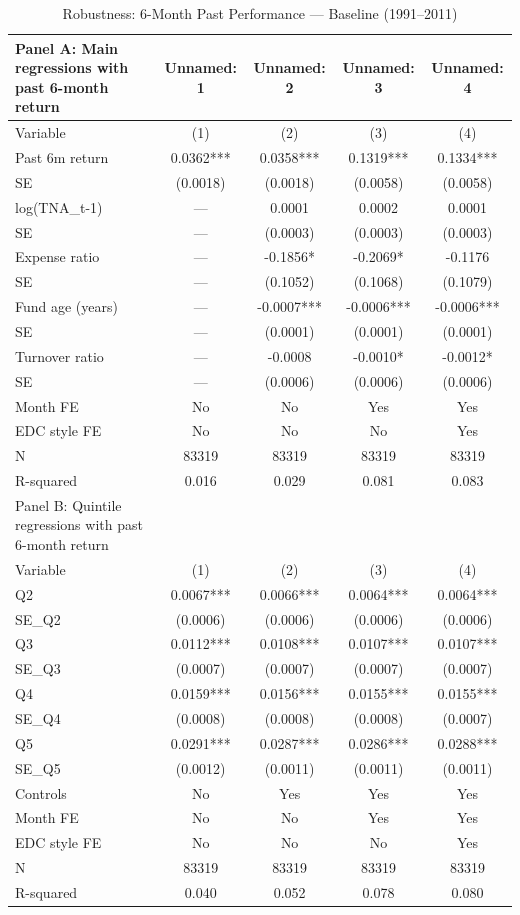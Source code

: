 \begin{table}[htbp]
\centering
\caption{Robustness: 6-Month Past Performance --- Baseline (1991--2011)}
\label{tab:robustness_6m}
\small
\begin{tabular}{lcccc}
\toprule
Panel A: Main regressions with past 6-month return & Unnamed: 1 & Unnamed: 2 & Unnamed: 3 & Unnamed: 4 \\
\midrule
Variable & (1) & (2) & (3) & (4) \\
Past 6m return & 0.0362*** & 0.0358*** & 0.1319*** & 0.1334*** \\
SE & (0.0018) & (0.0018) & (0.0058) & (0.0058) \\
log(TNA\_t-1) & — & 0.0001 & 0.0002 & 0.0001 \\
SE & — & (0.0003) & (0.0003) & (0.0003) \\
Expense ratio & — & -0.1856* & -0.2069* & -0.1176 \\
SE & — & (0.1052) & (0.1068) & (0.1079) \\
Fund age (years) & — & -0.0007*** & -0.0006*** & -0.0006*** \\
SE & — & (0.0001) & (0.0001) & (0.0001) \\
Turnover ratio & — & -0.0008 & -0.0010* & -0.0012* \\
SE & — & (0.0006) & (0.0006) & (0.0006) \\
Month FE & No & No & Yes & Yes \\
EDC style FE & No & No & No & Yes \\
N & 83319 & 83319 & 83319 & 83319 \\
R-squared & 0.016 & 0.029 & 0.081 & 0.083 \\
Panel B: Quintile regressions with past 6-month return &  &  &  &  \\
Variable & (1) & (2) & (3) & (4) \\
Q2 & 0.0067*** & 0.0066*** & 0.0064*** & 0.0064*** \\
SE\_Q2 & (0.0006) & (0.0006) & (0.0006) & (0.0006) \\
Q3 & 0.0112*** & 0.0108*** & 0.0107*** & 0.0107*** \\
SE\_Q3 & (0.0007) & (0.0007) & (0.0007) & (0.0007) \\
Q4 & 0.0159*** & 0.0156*** & 0.0155*** & 0.0155*** \\
SE\_Q4 & (0.0008) & (0.0008) & (0.0008) & (0.0007) \\
Q5 & 0.0291*** & 0.0287*** & 0.0286*** & 0.0288*** \\
SE\_Q5 & (0.0012) & (0.0011) & (0.0011) & (0.0011) \\
Controls & No & Yes & Yes & Yes \\
Month FE & No & No & Yes & Yes \\
EDC style FE & No & No & No & Yes \\
N & 83319 & 83319 & 83319 & 83319 \\
R-squared & 0.040 & 0.052 & 0.078 & 0.080 \\
\bottomrule
\end{tabular}
\end{table}
